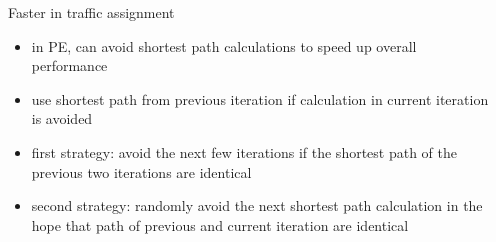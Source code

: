 \documentclass[final]{beamer}
\begin{document}
\begin{frame}{ }
\begin{columns}[t]
\begin{column}{.26\linewidth}
            \begin{block}{Faster in traffic assignment}
                \begin{itemize}
                    \itemsep.5em
                    \item in PE, can \alert{avoid} shortest path calculations to speed up overall performance
                    \item use shortest path from previous iteration if calculation in current iteration is avoided
                    \item first strategy: avoid the \alert{next few} iterations if the shortest path of the \alert{previous two} iterations are \alert{identical}
                    \item second strategy: \alert{randomly avoid} the next shortest path calculation in the hope that path of \alert{previous and current} iteration are \alert{identical}
                \end{itemize}
            \end{block}

        \end{column}
        \begin{column}{.4\linewidth}


\end{column}
\end{columns}
\end{frame}
\end{document}
